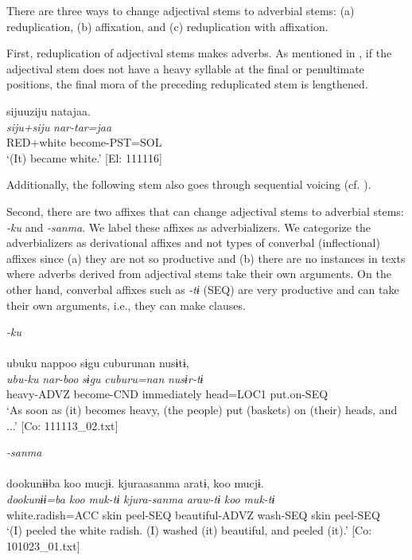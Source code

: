 There are three ways to change adjectival stems to adverbial stems: (a) reduplication, (b) affixation, and (c) reduplication with affixation.

  First, reduplication of adjectival stems makes adverbs. As mentioned in , if the adjectival stem does not have a heavy syllable at the final or penultimate positions, the final mora of the preceding reduplicated stem is lengthened.

\ea   \label{ex:4.60}
\glll    sijuuziju  natajaa.\\
    \textit{siju+siju}  \textit{nar-tar=jaa}\\
    RED+white  become-PST=SOL\\
    \glt     ‘(It) became white.’ [El: 111116]
\z

Additionally, the following stem also goes through sequential voicing (cf. ).

Second, there are two affixes that can change adjectival stems to adverbial stems: \textit{{}-ku} and \textit{{}-sanma}. We label these affixes as adverbializers. We categorize the adverbializers as derivational affixes and not types of converbal (inflectional) affixes since (a) they are not so productive and (b) there are no instances in texts where adverbs derived from adjectival stems take their own arguments. On the other hand, converbal affixes such as \textit{{}-tɨ} (SEQ) are very productive and can take their own arguments, i.e., they can make clauses.

\ea  \label{ex:4.61} \ea  \textit{{}-ku} \label{ex:4.61a}\\\\
    \glll     ubuku  nappoo  sɨgu  cuburunan  nusɨtɨ,\\
      \textit{ubu-ku}  \textit{nar-boo}  \textit{sɨgu}  \textit{cuburu=nan}  \textit{nusɨr-tɨ}\\
      heavy-ADVZ  become-CND  immediately  head=LOC1  put.on-SEQ\\
      \glt       ‘As soon as (it) becomes heavy, (the people) put (baskets) on (their) heads, and ...’ [Co: 111113\_02.txt]

\ex  \textit{{}-sanma}\\\\
\glll dookunɨɨba  koo  mucjɨ.  kjuraasanma  aratɨ,   koo  mucjɨ.\\
      \textit{dookunɨɨ=ba}  \textit{koo}  \textit{muk-tɨ}  \textit{kjura-sanma}  \textit{araw-tɨ}  \textit{koo}  \textit{muk-tɨ}\\                                                                                                  
      white.radish=ACC  skin  peel-SEQ  beautiful-ADVZ  wash-SEQ                                   skin  peel-SEQ\\
      \glt       ‘(I) peeled the white radish. (I) washed (it) beautiful, and peeled (it).’     [Co: 101023\_01.txt]
    \z
\z

